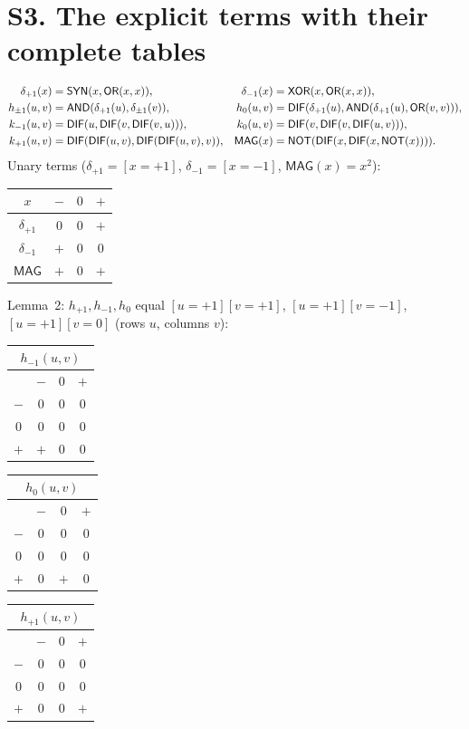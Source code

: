 \documentclass[10pt,a4paper]{article}
\begin{document}
\section*{S3. The explicit terms with their complete tables}
\begin{align*}
\delta_{+1}(x)&=\mathsf{SYN}(x,\mathsf{OR}(x,x)), & \delta_{-1}(x)&=\mathsf{XOR}(x,\mathsf{OR}(x,x)),\\
h_{\pm1}(u,v)&=\mathsf{AND}(\delta_{+1}(u),\delta_{\pm1}(v)), & h_0(u,v)&=\mathsf{DIF}(\delta_{+1}(u),\mathsf{AND}(\delta_{+1}(u),\mathsf{OR}(v,v))),\\
k_{-1}(u,v)&=\mathsf{DIF}(u,\mathsf{DIF}(v,\mathsf{DIF}(v,u))), & k_0(u,v)&=\mathsf{DIF}(v,\mathsf{DIF}(v,\mathsf{DIF}(u,v))),\\
k_{+1}(u,v)&=\mathsf{DIF}(\mathsf{DIF}(u,v),\mathsf{DIF}(\mathsf{DIF}(u,v),v)), & \mathsf{MAG}(x)&=\mathsf{NOT}(\mathsf{DIF}(x,\mathsf{DIF}(x,\mathsf{NOT}(x)))).
\end{align*}
Unary terms ($\delta_{+1}=[x{=}+1]$, $\delta_{-1}=[x{=}-1]$, $\mathsf{MAG}(x)=x^2$):
\begin{center}\begin{tabular}{c|ccc}$x$&$-$&$0$&$+$\\\hline $\delta_{+1}$&$0$&$0$&$+$\\ $\delta_{-1}$&$+$&$0$&$0$\\ $\mathsf{MAG}$&$+$&$0$&$+$\end{tabular}\end{center}
Lemma~2: $h_{+1},h_{-1},h_0$ equal $[u{=}{+1}][v{=}{+1}]$, $[u{=}{+1}][v{=}{-1}]$, $[u{=}{+1}][v{=}0]$ (rows $u$, columns $v$):
\begin{center}\begin{tabular}{c|ccc}\multicolumn{4}{c}{$h_{-1}(u,v)$}\\\hline &$-$&$0$&$+$\\\hline $-$&$0$&$0$&$0$\\$0$&$0$&$0$&$0$\\$+$&$+$&$0$&$0$\\\end{tabular}\quad\begin{tabular}{c|ccc}\multicolumn{4}{c}{$h_{0}(u,v)$}\\\hline &$-$&$0$&$+$\\\hline $-$&$0$&$0$&$0$\\$0$&$0$&$0$&$0$\\$+$&$0$&$+$&$0$\\\end{tabular}\quad\begin{tabular}{c|ccc}\multicolumn{4}{c}{$h_{+1}(u,v)$}\\\hline &$-$&$0$&$+$\\\hline $-$&$0$&$0$&$0$\\$0$&$0$&$0$&$0$\\$+$&$0$&$0$&$+$\\\end{tabular}\end{center}
\end{document}
